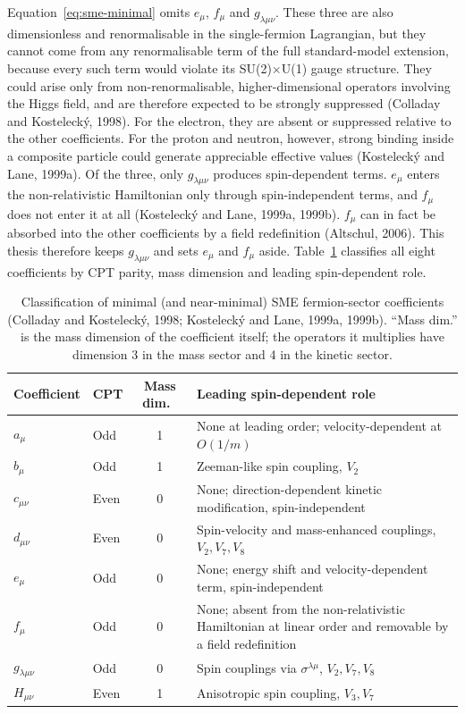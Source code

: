 Equation~\eqref{eq:sme-minimal} omits $e_\mu$, $f_\mu$ and
$g_{\lambda\mu\nu}$. These three are also dimensionless and renormalisable
in the single-fermion Lagrangian, but they cannot come from any
renormalisable term of the full standard-model extension, because every
such term would violate its SU(2)$\times$U(1) gauge structure. They could
arise only from non-renormalisable, higher-dimensional operators involving
the Higgs field, and are therefore expected to be strongly suppressed
(Colladay and Kosteleck\'{y}, 1998). For the electron, they are absent or
suppressed relative to the other coefficients. For the proton and neutron,
however, strong binding inside a composite particle could generate
appreciable effective values (Kosteleck\'{y} and Lane, 1999a). Of the three,
only $g_{\lambda\mu\nu}$ produces spin-dependent terms. $e_\mu$ enters
the non-relativistic Hamiltonian only through spin-independent terms, and
$f_\mu$ does not enter it at all (Kosteleck\'{y} and Lane, 1999a, 1999b).
$f_\mu$ can in fact be absorbed into the other coefficients by a field
redefinition (Altschul, 2006). This thesis therefore keeps
$g_{\lambda\mu\nu}$ and sets $e_\mu$ and $f_\mu$ aside.
Table~\ref{tab:sme-classification} classifies all eight coefficients by
CPT parity, mass dimension and leading spin-dependent role.

\begin{table}[h]
\centering
\begin{tabular}{@{}llc>{\raggedright\arraybackslash}p{6.5cm}@{}}
\toprule
Coefficient & CPT & Mass dim.\ & Leading spin-dependent role \\
\midrule
$a_\mu$        & Odd  & 1 & None at leading order; velocity-dependent at $O(1/m)$ \\
$b_\mu$        & Odd  & 1 & Zeeman-like spin coupling, $V_2$ \\
$c_{\mu\nu}$   & Even & 0 & None; direction-dependent kinetic modification, spin-independent \\
$d_{\mu\nu}$   & Even & 0 & Spin-velocity and mass-enhanced couplings, $V_2,V_7,V_8$ \\
$e_\mu$        & Odd  & 0 & None; energy shift and velocity-dependent term, spin-independent \\
$f_\mu$        & Odd  & 0 & None; absent from the non-relativistic Hamiltonian at linear order and removable by a field redefinition \\
$g_{\lambda\mu\nu}$ & Odd & 0 & Spin couplings via $\sigma^{\lambda\mu}$, $V_2,V_7,V_8$ \\
$H_{\mu\nu}$   & Even & 1 & Anisotropic spin coupling, $V_3,V_7$ \\
\bottomrule
\end{tabular}
\caption{Classification of minimal (and near-minimal) SME fermion-sector
coefficients (Colladay and Kostelecký, 1998; Kostelecký and Lane, 1999a, 1999b). ``Mass dim.'' is the mass dimension of the coefficient itself; the
operators it multiplies have dimension 3 in the mass sector and 4 in the kinetic sector.}
\label{tab:sme-classification}
\end{table}

